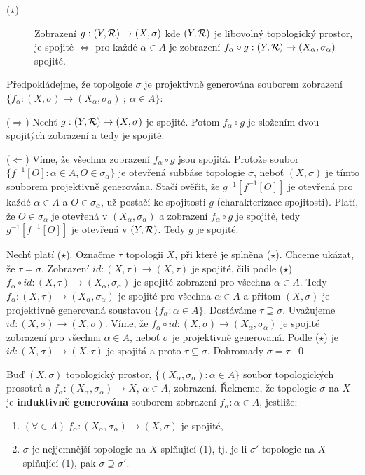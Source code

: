 \documentclass[12pt,a4paper]{article}
\begin{document}
\begin{description}
\item[($\star$)] Zobrazení $g : (Y,\mathcal{ R }) \to (X, \sigma)$ kde $(Y, \mathcal{ R })$ je libovolný topologický prostor, je spojité $\iff$ pro každé $\alpha \in A$ je zobrazení $f_\alpha \circ g: (Y,\mathcal{ R }) \to (X_\alpha, \sigma_\alpha)$ spojité.
\end{description}

\dukaz Předpokládejme, že topolgoie $\sigma$ je projektivně generována souborem
zobrazení $\{f_\alpha : (X,\sigma) \to (X_\alpha, \sigma_\alpha)~;~\alpha \in
A\}$:

($\Rightarrow$) Nechť $g : (Y, \mathcal{ R }) \to (X,\sigma)$ je spojité. Potom
$f_\alpha \circ g$ je složením dvou spojitých zobrazení a tedy je spojité.

($\Leftarrow$) Víme, že všechna zobrazení $f_\alpha \circ g$ jsou spojitá.
Protože soubor $\{f^{-1}[O] : \alpha \in A, O \in \sigma_\alpha\}$ je otevřená
subbáse topologie $\sigma$, neboť $(X, \sigma)$ je tímto souborem projektivně
generována. Stačí ověřit, že $g^{-1}[f^{-1}[O]]$ je otevřená pro každé $\alpha
\in A$ a $O \in \sigma_\alpha$, už postačí ke spojitosti $g$ (charakterizace
spojitosti). Platí, že $O\in\sigma_\alpha$ je otevřená v
$(X_\alpha,\sigma_\alpha)$ a zobrazení $f_\alpha \circ g$ je spojité, tedy
$g^{-1}[f^{-1}[O]]$ je otevřená v $(Y, \mathcal{ R })$. Tedy $g$ je spojité.

Nechť platí ($\star$). Označme $\tau$ topologii $X$, při které je splněna
($\star$). Chceme ukázat, že $\tau = \sigma$. Zobrazení $id : (X, \tau) \to
(X,\tau)$ je spojité, čili podle ($\star$) $f_\alpha \circ id : (X,\tau) \to
(X_\alpha, \sigma_\alpha)$ je spojité zobrazení pro všechna $\alpha \in A$.
Tedy $f_\alpha : (X,\tau) \to (X_\alpha, \sigma_\alpha)$ je spojité pro všechna
$\alpha \in A$ a přitom $(X,\sigma)$ je projektivně generovaná soustavou
$\{f_\alpha : \alpha \in A\}$. Dostáváme $\tau \supseteq \sigma$. Uvažujeme $id
: (X, \sigma) \to (X,\sigma)$. Víme, že $f_\alpha \circ id : (X,\sigma) \to
(X_\alpha, \sigma_\alpha)$ je spojité zobrazení pro všechna $\alpha \in A$,
neboť $\sigma$ je projektivně generovaná. Podle ($\star$) je $id : (X,\sigma)
\to (X,\tau)$ je spojitá a proto $\tau \subseteq \sigma$. Dohromady $\sigma =
\tau$.
\qed

 Buď $(X,\sigma)$ topologický prostor, $\{(X_\alpha,\sigma_\alpha) : \alpha \in A\}$ soubor topologických prosotrů a $f_\alpha : (X_\alpha,\sigma_\alpha) \to X$, $\alpha \in A$, zobrazení. Řekneme, že topologie $\sigma$ na $X$ je {\bf induktivně generována} souborem zobrazení ${f_\alpha : \alpha \in A}$, jestliže:
\begin{enumerate}
\item $(\forall \in A)~f_\alpha : (X_\alpha,\sigma_\alpha) \to (X,\sigma)$ je spojité,
\item $\sigma$ je nejjemnější topologie na $X$ splňující (1), tj. je-li $\sigma'$ topologie na $X$ splňující (1), pak $\sigma \supseteq \sigma'$.
\end{enumerate}
\end{document}
